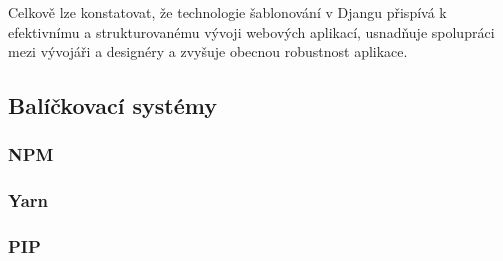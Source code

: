 Celkově lze konstatovat, že technologie šablonování v Djangu přispívá k efektivnímu a strukturovanému vývoji webových aplikací, usnadňuje spolupráci mezi vývojáři a designéry a zvyšuje obecnou robustnost aplikace.

\subsection{Balíčkovací systémy}
\label{subsec:dev-technology-package-managers}

\subsubsection{NPM}
\label{subsubsec:dev-technology-package-managers-npm}

\subsubsection{Yarn}
\label{subsubsec:dev-technology-package-managers-yarn}

\subsubsection{PIP}
\label{subsubsec:dev-technology-package-managers-pip}

\endinput